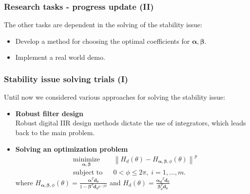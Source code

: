 \documentclass[10pt,pdflatex,headrule,landscape]{beamer}
\newcommand\vecnot[1]{\boldsymbol{#1}}
\begin{document}
\begin{frame}
\frametitle{Research tasks - progress update (II)}
The other tasks are dependent in the solving of the stability issue:
\begin{itemize}
\item
{
Develop a method for choosing the optimal coefficients for $ \vecnot{\alpha},\vecnot{\beta} $.
}
\item
{
Implement a real world demo.
}
\end{itemize}
\end{frame}

\begin{frame}
\frametitle{Stability issue solving trials (I)}
Until now we considered various approaches for solving the stability issue:
\begin{itemize}
\item
{
\textbf{Robust filter design}
\\
Robust digital IIR design methods \cite{Agarwal1975NewNoise,Li1993RoundoffRealizations,Kauraniemi1998DeltaFilters} dictate the use of integrators, which leads back to the main problem.
}
\item
{
\textbf{Solving an optimization problem}
\\
\begin{equation*}
\begin{aligned}
& \underset{\vecnot{\alpha},\vecnot{\beta}}{\text{minimize}}
& & 
\left\lVert 
H_{d}(\theta) - H_{\vecnot{\alpha},\vecnot{\beta},\phi}(\theta)
\right\rVert^p
\\
& \text{subject to}
& & 0 < \phi \leq 2\pi, \; i = 1, \ldots, m.
\end{aligned}
\end{equation*}
where 
$ 
H_{\vecnot{\alpha},\vecnot{\beta},\phi}(\theta) =  
\frac
{
\vecnot{\alpha}^{T}
\vecnot{d}_{\theta}
}
{
1
-
\vecnot{\beta}^{T}\vecnot{d}_{\theta}
e^{-j\phi}
}
$
and 
$ 
H_{d}(\theta) =  
\frac
{
\vecnot{\alpha_{d}}^{T}
\vecnot{d}_{\theta}
}
{
\vecnot{\beta}_{d}^{T}\vecnot{d}_{\theta}
}
$
}
\end{itemize}
\end{frame}
\end{document}
